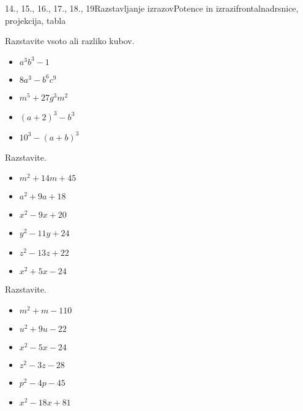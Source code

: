 \begin{priprava}{14., 15., 16., 17., 18., 19}{}{Razstavljanje izrazov}{Potence in izrazi}{frontalna}{drsnice, projekcija, tabla}
\begin{multicols}{2}
            \begin{naloga}
                Razstavite vsoto ali razliko kubov.
                \begin{itemize}
                    \item $a^3b^3-1$ 
                    \item $8a^3-b^6c^9$ 
                    \item $m^5+27g^3m^2$ 
                    \item $(a+2)^3-b^3$ 
                    \item $10^3-(a+b)^3$ 
                \end{itemize}
            \end{naloga}
        
    
        
            \begin{naloga}
                Razstavite.
                \begin{itemize}
                    \item $m^2+14m+45$ 
                    \item $a^2+9a+18$ 
                    \item $x^2-9x+20$ 
                    \item $y^2-11y+24$ 
                    \item $z^2-13z+22$ 
                    \item $x^2+5x-24$ 
                \end{itemize}
            \end{naloga}
        
    
        
            \begin{naloga}
                Razstavite.
                \begin{itemize}
                    \item $m^2+m-110$ 
                    \item $u^2+9u-22$ 
                    \item $x^2-5x-24$ 
                    \item $z^2-3z-28$ 
                    \item $p^2-4p-45$ 
                    \item $x^2-18x+81$ 
                \end{itemize}
            \end{naloga}
        
    
        

\end{multicols}
\end{priprava}

